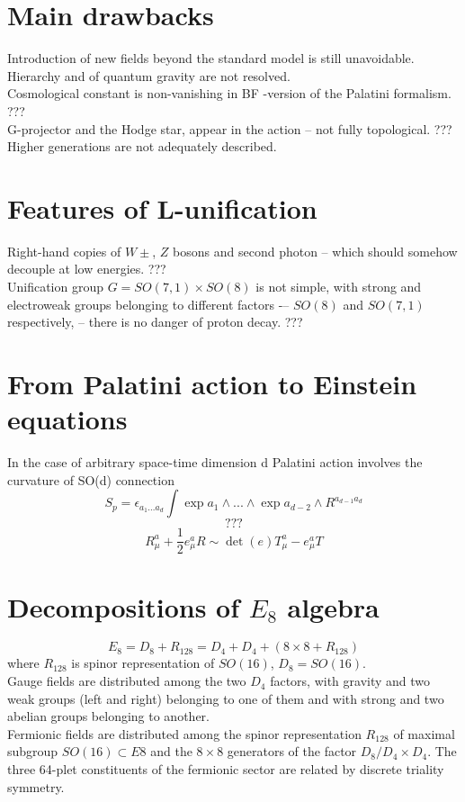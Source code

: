 \documentclass{article}
\begin{document}
\newpage
\section{Main drawbacks}
Introduction of new fields beyond the standard model is still unavoidable. \\
Hierarchy and of quantum gravity are not resolved. \\
Cosmological constant is non-vanishing in BF -version of the Palatini formalism. ???\\
G-projector and the Hodge star, appear in the action -- not fully topological. ???\\
Higher generations are not adequately described. \\

\section{Features of L-unification}
Right-hand copies of $W±$, $Z$ bosons and second photon – which should somehow decouple at low energies. ??? \\
Unification group $G = SO(7, 1) \times SO(8)$ is not simple, with strong and electroweak groups belonging to different factors -– $SO(8)$ and $SO(7, 1)$ respectively, – there is no danger of proton decay. ???\\

\section{From Palatini action to Einstein equations}
In the case of arbitrary space-time dimension d Palatini action involves the curvature of SO(d) connection
\begin{equation}
    S_p = \epsilon_{a_1 ... a_d} \int \exp{a_1} \land ... \land \exp{a_{d-2}} \land R^{a_{d-1}a_d}
\end{equation}
\begin{equation}
    ???
\end{equation}
\begin{equation}
    R_\mu^a + \frac{1}{2}e_\mu^a R \sim \det(e)T_\mu^a - e^a_\mu T
\end{equation}

\newpage
\section{Decompositions of $E_8$ algebra}
\begin{equation}
    E_8 = D_8 + R_{128} = D_4 + D_4 + (8 \times 8 + R_{128})
\end{equation}
where $R_{128}$ is spinor representation of $SO(16)$, $D_8 = SO(16)$. \\

Gauge fields are distributed among the two $D_4$ factors, with gravity and two weak groups (left and right) belonging to one of them and with strong and two abelian groups belonging to another. \\
Fermionic fields are distributed among the spinor representation $R_128$ of maximal subgroup $SO(16) \subset E8$ and the $8 \times 8$ generators of the factor $D_8/D_4 \times D_4$. The three 64-plet constituents of the fermionic sector are related by discrete triality symmetry. \\
\end{document}
